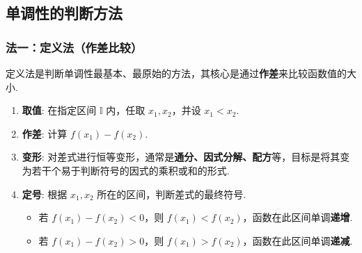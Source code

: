 \subsection{单调性的判断方法}

\subsubsection*{法一：定义法（作差比较）}
定义法是判断单调性最基本、最原始的方法，其核心是通过\textbf{作差}来比较函数值的大小.

\begin{note}[定义法四步流程]
	\begin{enumerate}
		\item \textbf{取值}: 在指定区间 $\mathbb{I}$ 内，任取 $x_1, x_2$，并设 $x_1 < x_2$.
		\item \textbf{作差}: 计算 $f(x_1) - f(x_2)$.
		\item \textbf{变形}: 对差式进行恒等变形，通常是\textbf{通分、因式分解、配方}等，目标是将其变为若干个易于判断符号的因式的乘积或和的形式.
		\item \textbf{定号}: 根据 $x_1, x_2$ 所在的区间，判断差式的最终符号.
		\begin{itemize}
			\item 若 $f(x_1) - f(x_2) < 0$，则 $f(x_1) < f(x_2)$，函数在此区间单调\textbf{递增}.
			\item 若 $f(x_1) - f(x_2) > 0$，则 $f(x_1) > f(x_2)$，函数在此区间单调\textbf{递减}.
		\end{itemize}
	\end{enumerate}
\end{note}

